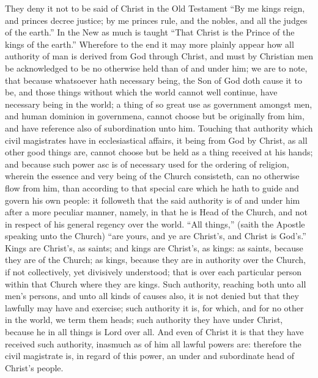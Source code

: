 They deny it not to be said of Christ in the Old Testament “By me kings reign, and princes decree justice; by me princes rule, and the nobles, and all the judges of the earth.” In the New as much is taught “That Christ is the Prince of the kings of the earth.” Wherefore to the end it may more plainly appear how all authority of man is derived from God through Christ, and must by Christian men be acknowledged to be no otherwise held than of and under him;  we are to note, that because whatsoever hath necessary being, the Son of God doth cause it to be, and those things without which the world cannot well continue, have necessary being in the world; a thing of so great use as government amongst men, and human dominion in governmena, cannot choose but be originally from him, and have reference also of subordination unto him. Touching that authority which civil magistrates have in ecclesiastical affairs, it being from God by Christ, as all other good things are, cannot choose but be held as a thing received at his hands; and because such power asc is of necessary used for the ordering of religion, wherein the essence and very being of the Church consisteth, can no otherwise flow from him, than according to that special care which he hath to guide and govern his own people: it followeth that the said authority is of and under him after a more peculiar manner, namely, in that he is Head of the Church, and not in respect of his general regency over the world. “All things,” (saith the Apostle speaking unto the Church) “are yours, and ye are Christ’s, and Christ is God’s.” Kings are Christ’s, as saints; and kings are Christ’s, as kings: as saints, because they are of the Church; as kings, because they are in authority over the Church, if not collectively, yet divisively understood; that is over each particular person within that Church where they are kings. Such authority, reaching both unto all men’s persons, and unto all kinds of causes also, it is not denied but that they lawfully may have and exercise; such authority it is, for which, and for no other in the world, we term them heads; such authority they have under Christ, because he in all things is Lord over all. And even of Christ it is that they have received such authority, inasmuch as of him all lawful powers are: therefore the civil magistrate is, in regard of this power, an under and subordinate head of Christ’s people.


